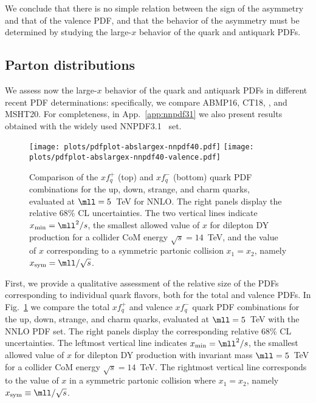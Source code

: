We conclude that there
is no simple relation between the sign of the asymmetry and that of
the valence PDF, and that the
behavior of the asymmetry must be determined by studying the large-$x$
behavior of the quark and antiquark PDFs.

\subsection{Parton distributions}
\label{sec:subsec-largexPDFs}

We assess now the large-$x$ behavior of
the quark and antiquark PDFs in different recent PDF
determinations: specifically, we compare
 ABMP16,
 CT18,  ,
 and MSHT20.
%
 For
completeness, in App.~\ref{app:nnpdf31} we also present results
obtained with the widely used NNPDF3.1~\cite{Ball:2017nwa} set.

\begin{figure}[!t]
 \centering
 \texttt{[image: plots/pdfplot-abslargex-nnpdf40.pdf]}
 \texttt{[image: plots/pdfplot-abslargex-nnpdf40-valence.pdf]}
 \caption{\small Comparison of the $xf^+_q$ (top) and $xf_q^-$ (bottom) quark
   PDF combinations for the up, down, strange, and charm quarks,
   evaluated at $\mll=5$~TeV for  NNLO.
   The right panels display the relative 68\% CL uncertainties.
   The two vertical lines indicate $x_{\rm min}=\mll^2/s$, the
   smallest allowed value of $x$ 
   for dilepton DY production for a collider
   CoM energy $\sqrt{s}=14$~TeV, and the value of $x$
   corresponding to a symmetric partonic collision $x_1=x_2$, namely
 $x_{\rm  sym}=\mll/\sqrt{s}$.
 }    
 \label{fig:pdfplot-abslargex}
\end{figure}

First, we provide a qualitative assessment of the relative size of the
PDFs corresponding to
individual quark flavors, both for the total and valence PDFs.
In Fig.~\ref{fig:pdfplot-abslargex} we
compare  the total $xf^+_q$ and valence $xf_q^-$  quark
   PDF combinations for the up, down, strange, and charm quarks,
   evaluated at $\mll=5$~TeV with the  NNLO PDF set.
   The right panels display the corresponding relative 68\% CL uncertainties.
  The leftmost vertical line indicates $x_{\rm min}=\mll^2/s$, the
  smallest allowed value of $x$ 
   for dilepton DY production with invariant mass $\mll=5$~TeV for a collider
   CoM energy $\sqrt{s}=14$~TeV.
   The rightmost vertical line corresponds to
   the value of $x$ in a symmetric partonic collision where $x_1=x_2$, namely
   $x_{\rm  sym}\equiv\mll/\sqrt{s}$.

